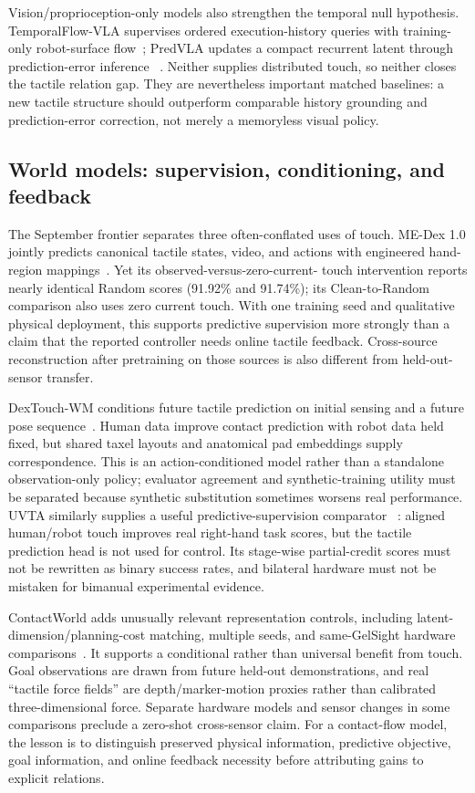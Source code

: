 Vision/proprioception-only models also strengthen the temporal null hypothesis.
TemporalFlow-VLA supervises ordered execution-history queries with training-only
robot-surface flow~\cite{yang2026temporalflowvla}; PredVLA updates a compact
recurrent latent through prediction-error inference
~\cite{sawada2026predvla}. Neither supplies distributed touch, so neither closes
the tactile relation gap. They are nevertheless important matched baselines: a
new tactile structure should outperform comparable history grounding and
prediction-error correction, not merely a memoryless visual policy.

\subsection{World models: supervision, conditioning, and feedback}

The September frontier separates three often-conflated uses of touch. ME-Dex 1.0
jointly predicts canonical tactile states, video, and actions with engineered
hand-region mappings~\cite{zhang2026medex}. Yet its observed-versus-zero-current-
touch intervention reports nearly identical Random scores (91.92\% and 91.74\%);
its Clean-to-Random comparison also uses zero current touch. With one training
seed and qualitative physical deployment, this supports predictive supervision
more strongly than a claim that the reported controller needs online tactile
feedback. Cross-source reconstruction after pretraining on those sources is also
different from held-out-sensor transfer.

DexTouch-WM conditions future tactile prediction on initial sensing and a future
pose sequence~\cite{qin2026dextouchwm}. Human data improve contact prediction
with robot data held fixed, but shared taxel layouts and anatomical pad embeddings
supply correspondence. This is an action-conditioned model rather than a
standalone observation-only policy; evaluator agreement and synthetic-training
utility must be separated because synthetic substitution sometimes worsens real
performance. UVTA similarly supplies a useful predictive-supervision comparator
~\cite{li2026uvta}: aligned human/robot touch improves real right-hand task
scores, but the tactile prediction head is not used for control. Its stage-wise
partial-credit scores must not be rewritten as binary success rates, and
bilateral hardware must not be mistaken for bimanual experimental evidence.

ContactWorld adds unusually relevant representation controls, including
latent-dimension/planning-cost matching, multiple seeds, and same-GelSight
hardware comparisons~\cite{zhang2026contactworld}. It supports a conditional
rather than universal benefit from touch. Goal observations are drawn from future
held-out demonstrations, and real ``tactile force fields'' are depth/marker-motion
proxies rather than calibrated three-dimensional force. Separate hardware models
and sensor changes in some comparisons preclude a zero-shot cross-sensor claim.
For a contact-flow model, the lesson is to distinguish preserved physical
information, predictive objective, goal information, and online feedback
necessity before attributing gains to explicit relations.

